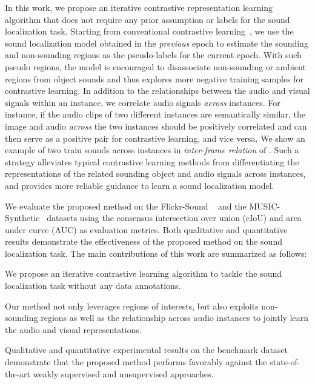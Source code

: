 In this work, we propose an iterative contrastive representation learning algorithm that does not require any prior assumption or labels for the sound localization task.
%
Starting from conventional contrastive learning~\cite{av_cvpr18_lls,av_tpami20_lls}, we use the sound localization model obtained in the \emph{previous} epoch to estimate the sounding and non-sounding regions as the pseudo-labels for the current epoch.
%
With such pseudo regions, the model is encouraged to disassociate non-sounding or ambient regions from object sounds and thus explores more negative training samples for contrastive learning.
%
In addition to the relationships between the audio and visual signals within an instance, we correlate audio signals \emph{across} instances.
%
For instance, if the audio clips of two different instances are semantically similar, the image and audio \emph{across} the two instances should be positively correlated and can then serve as a positive pair for contrastive learning, and vice versa.
%
We show an example of two train sounds across instances in \emph{inter-frame relation} of .
%
Such a strategy alleviates typical contrastive learning methods from differentiating the representations of the related sounding object and audio signals across instances, and provides more reliable guidance to learn a sound localization model.
%

We evaluate the proposed method on the Flickr-Sound ~\cite{av_cvpr18_lls,av_tpami20_lls} and the MUSIC-Synthetic~\cite{av_nips20_loc} datasets using the consensus intersection over union (cIoU) and area under curve (AUC) as evaluation metrics.
%
Both qualitative and quantitative results demonstrate the effectiveness of the proposed method on the sound localization task.
%
The main contributions of this work are summarized as follows:
\begin{compactitem}
  \item We propose an iterative contrastive learning algorithm to tackle the sound localization task without any data annotations.
  \item Our method not only leverages regions of interests, but also exploits non-sounding regions as well as the relationship across audio instances to jointly learn the audio and visual representations.
  \item Qualitative and quantitative experimental results on the benchmark dataset demonstrate that the proposed method performs favorably against the state-of-the-art weakly supervised and unsupervised approaches. %
\end{compactitem}

